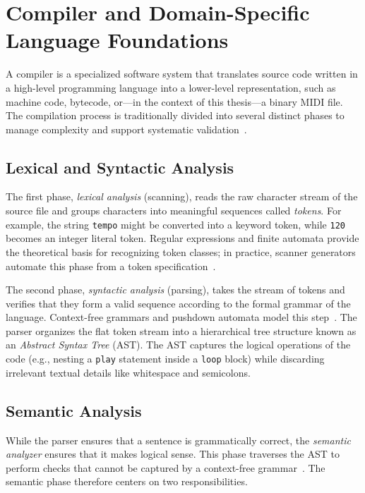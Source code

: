 \section{Compiler and Domain-Specific Language Foundations}\label{sec:compiler-dsl-foundations}

A compiler is a specialized software system that translates source code written in a high-level programming language
into a lower-level representation, such as machine code, bytecode, or---in the context of this thesis---a binary MIDI
file.
The compilation process is traditionally divided into several distinct phases to manage complexity and support
systematic validation~\cite{Aho_Lam_Sethi_Ullman_2006,Cooper_Torczon_2011}.

\subsection{Lexical and Syntactic Analysis}\label{detail-subsec:lexical-and-syntactic-analysis}

The first phase, \textit{lexical analysis} (scanning), reads the raw character stream of the source file and groups
characters into meaningful sequences called \textit{tokens}.
For example, the string \texttt{tempo} might be converted into a keyword token, while \texttt{120} becomes an integer
literal token.
Regular expressions and finite automata provide the theoretical basis for recognizing token classes; in practice,
scanner generators automate this phase from a token specification~\cite{Aho_Lam_Sethi_Ullman_2006}.

The second phase, \textit{syntactic analysis} (parsing), takes the stream of tokens and verifies that they form a
valid sequence according to the formal grammar of the language.
Context-free grammars and pushdown automata model this step~\cite{Aho_Lam_Sethi_Ullman_2006}.
The parser organizes the flat token stream into a hierarchical tree structure known as an \textit{Abstract Syntax Tree}
(AST).
The AST captures the logical operations of the code (e.g., nesting a \texttt{play} statement inside a \texttt{loop}
block) while discarding irrelevant textual details like whitespace and semicolons.

\subsection{Semantic Analysis}\label{detail-subsec:semantic-analysis}

While the parser ensures that a sentence is grammatically correct, the \textit{semantic analyzer} ensures that it makes
logical sense.
This phase traverses the AST to perform checks that cannot be captured by a context-free
grammar~\cite{Cooper_Torczon_2011}.
The semantic phase therefore centers on two responsibilities.


